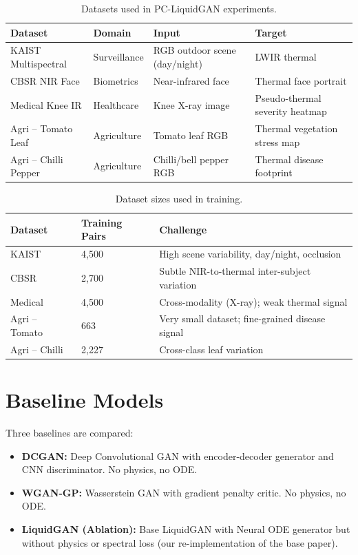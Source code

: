 \begin{table}[htbp]
\centering
\caption{Datasets used in PC-LiquidGAN experiments.}
\label{tab:datasets}
\begin{tabular}{llp{3.5cm}p{3.5cm}}
\toprule
\textbf{Dataset} & \textbf{Domain} & \textbf{Input} & \textbf{Target} \\
\midrule
KAIST Multispectral & Surveillance & RGB outdoor scene (day/night) & LWIR thermal \\
CBSR NIR Face & Biometrics & Near-infrared face & Thermal face portrait \\
Medical Knee IR & Healthcare & Knee X-ray image & Pseudo-thermal severity heatmap \\
Agri -- Tomato Leaf & Agriculture & Tomato leaf RGB & Thermal vegetation stress map \\
Agri -- Chilli Pepper & Agriculture & Chilli/bell pepper RGB & Thermal disease footprint \\
\bottomrule
\end{tabular}
\end{table}

\begin{table}[htbp]
\centering
\caption{Dataset sizes used in training.}
\label{tab:dataset_sizes}
\begin{tabular}{lll}
\toprule
\textbf{Dataset} & \textbf{Training Pairs} & \textbf{Challenge} \\
\midrule
KAIST & 4,500 & High scene variability, day/night, occlusion \\
CBSR & 2,700 & Subtle NIR-to-thermal inter-subject variation \\
Medical & 4,500 & Cross-modality (X-ray); weak thermal signal \\
Agri -- Tomato & 663 & Very small dataset; fine-grained disease signal \\
Agri -- Chilli & 2,227 & Cross-class leaf variation \\
\bottomrule
\end{tabular}
\end{table}

\section{Baseline Models}

Three baselines are compared:
\begin{itemize}
    \item \textbf{DCGAN:} Deep Convolutional GAN with encoder-decoder generator and CNN discriminator. No physics, no ODE.
    \item \textbf{WGAN-GP:} Wasserstein GAN with gradient penalty critic. No physics, no ODE.
    \item \textbf{LiquidGAN (Ablation):} Base LiquidGAN with Neural ODE generator but without physics or spectral loss (our re-implementation of the base paper).
\end{itemize}

